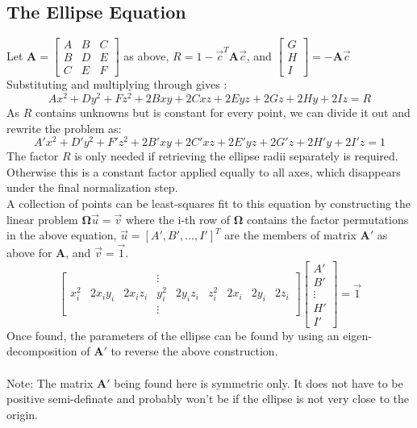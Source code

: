 \documentclass{article}
\def\mat#1{\mathbf{#1}}
\begin{document}
\subsection{The Ellipse Equation}
Let $\mat{A} = \left[ \begin{smallmatrix}
A & B & C \\
B & D & E \\
C & E & F
\end{smallmatrix} \right]$ as above, 
$R = 1 - \vec{c}^T\mat{A}\vec{c}$, and $\left[\begin{smallmatrix}
G\\H\\I \end{smallmatrix}\right] = -\mat{A}\vec{c}$
\\
Substituting and multiplying through gives :
\\
\begin{equation}
Ax^2 + Dy^2 + Fz^2 + 2Bxy + 2Cxz +2Eyz + 2Gz + 2Hy + 2Iz = R
\end{equation}
As $R$ contains unknowns but is constant for every point, we can divide it out and rewrite the problem as:
\begin{equation}
A'x^2 + D'y^2 + F'z^2 + 2B'xy + 2C'xz +2E'yz + 2G'z + 2H'y + 2I'z = 1
\end{equation}
The factor $R$ is only needed if retrieving the ellipse radii separately
is required. Otherwise this is a constant factor applied equally
to all axes, which disappears under the final normalization step.
\\
A collection of points can be least-squares fit to this equation
by constructing the linear problem
$\mat{\Omega}\vec{u} = \vec{v}$ where the i-th row of $\mat{\Omega}$ contains the factor permutations in
the above equation, $\vec{u} =
\left[A',B',...,I'\right]^T$ are the members of matrix $\mat{A}'$ as above for $\mat{A}$, and $\vec{v}=\vec{1}$.
\begin{equation}
\left[ \begin{matrix}
& & & \vdots \\
x_i^2 & 2x_iy_i & 2x_iz_i & y_i^2 & 2y_iz_i & z_i^2 & 2x_i & 2y_i & 2z_i \\
& & & \vdots  
\end{matrix}\right]
\left[ \begin{matrix} A'\\ B'\\ \vdots\\ H'\\ I' \end{matrix}\right] = \vec{1}
\end{equation}
Once found, the parameters of the ellipse can be found by using an 
eigen-decomposition of $\mat{A}'$ to reverse the above construction.
\\
\\
Note: The matrix $\mat{A'}$ being found here is symmetric only. It does
not have to be positive semi-definate and probably won't be if the
ellipse is not very close to the origin.
%
\end{document}
